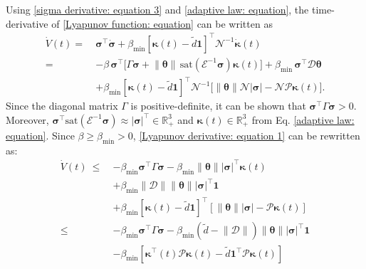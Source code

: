 \documentclass[lettersize,journal]{IEEEtran}
\begin{document}
Using \eqref{sigma derivative: equation 3} and \eqref{adaptive law: equation}, the time-derivative of \eqref{Lyapunov function: equation} can be written as
\begin{align}
\label{Lyapunov derivative: equation 1}
    \dot{V}(t)=~&\boldsymbol{\sigma}^{\top} \dot{\boldsymbol{\sigma}} + \beta_{\min} \left[\boldsymbol{\kappa}(t) - \tilde{d} \boldsymbol{1}\right]^{\top} \mathcal{N}^{-1} \dot{\boldsymbol{\kappa}}(t)\nonumber\\
    = & - \beta \, \boldsymbol{\sigma}^{\top} \Big[\Gamma \boldsymbol{\sigma} + \lVert \boldsymbol{\theta} \rVert \, \text{sat}( \mathcal{E}^{-1}\boldsymbol{\sigma}) \boldsymbol{\kappa}(t)\Big] + \beta_{\min} \, \boldsymbol{\sigma}^{\top} \mathcal{D} \boldsymbol{\theta} \nonumber\\
    & + \beta_{\min} \left[\boldsymbol{\kappa}(t) - \tilde{d} \boldsymbol{1}\right]^{\top} \mathcal{N}^{-1} \Big[\lVert \boldsymbol{\theta} \rVert \mathcal{N} \lvert \boldsymbol{\sigma} \rvert - \mathcal{N} \mathcal{P} \boldsymbol{\kappa}(t) \Big].
\end{align} 
Since the diagonal matrix $\Gamma$ is positive-definite, it can be shown that $\boldsymbol{\sigma}^{\top} \Gamma \boldsymbol{\sigma} > 0$.
Moreover, $\boldsymbol{\sigma}^{\top} \text{sat}( \mathcal{E}^{-1}\boldsymbol{\sigma}) \approx \lvert \boldsymbol{\sigma} \rvert^{\top} \in \mathbb{R}_+^3$ and $\boldsymbol{\kappa}(t) \in \mathbb{R}_+^3$ from Eq. \eqref{adaptive law: equation}.
Since $\beta \geq \beta_{\min} > 0$, \eqref{Lyapunov derivative: equation 1} can be rewritten as:
\begin{align}
\label{Lyapunov derivative: equation 2}
    \dot{V}(t)~{\leq}~& - \beta_{\min} \boldsymbol{\sigma}^{\top} \Gamma \boldsymbol{\sigma} - \beta_{\min} \lVert \boldsymbol{\theta} \rVert \lvert \boldsymbol{\sigma} \rvert^{\top} \boldsymbol{\kappa}(t) \nonumber \\
    & + \beta_{\min} \lVert\mathcal{D}\rVert \lVert \boldsymbol{\theta} \rVert \lvert \boldsymbol{\sigma} \rvert^{\top} \boldsymbol{1} \nonumber \\
    & + \beta_{\min} \left[\boldsymbol{\kappa}(t) - \tilde{d} \boldsymbol{1}\right]^{\top} \left[\lVert \boldsymbol{\theta} \rVert \lvert \boldsymbol{\sigma} \rvert - \mathcal{P} \boldsymbol{\kappa}(t) \right] \nonumber \\
    \leq ~ & - \beta_{\min} \boldsymbol{\sigma}^{\top} \Gamma \boldsymbol{\sigma} - \beta_{\min} \left( \tilde{d} - \lVert\mathcal{D}\rVert \right) \lVert \boldsymbol{\theta} \rVert \lvert \boldsymbol{\sigma} \rvert^{\top} \boldsymbol{1} \nonumber \\
    & - \beta_{\min} \left[\boldsymbol{\kappa}^{\top}(t) \mathcal{P} \boldsymbol{\kappa}(t) - \tilde{d} \boldsymbol{1}^{\top} \mathcal{P} \boldsymbol{\kappa}(t) \right]
\end{align}
\end{document}
